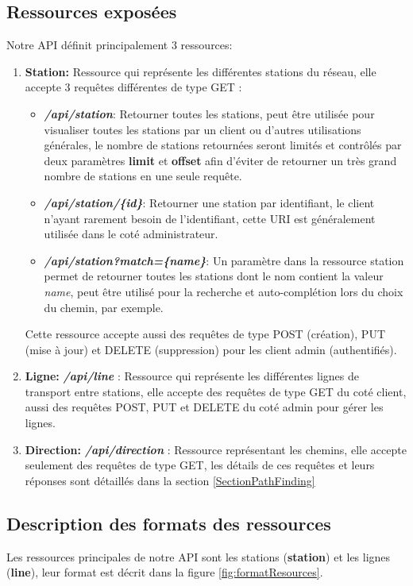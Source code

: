 \subsection{Ressources exposées}
Notre API définit principalement 3 ressources:
\begin{enumerate}
	\item \textbf{Station:} Ressource qui représente les différentes stations du réseau, elle accepte 3 requêtes différentes de type GET  : 
	      \begin{itemize}
	      	\item \emph{\textbf{/api/station}}: Retourner toutes les stations, peut être utilisée pour visualiser toutes les stations par un client ou d'autres utilisations générales, le nombre de stations retournées seront limités et contrôlés par deux paramètres \textbf{limit} et \textbf{offset} afin d'éviter de retourner un très grand nombre de stations en une seule requête.
	      	\item \emph{\textbf{/api/station/\{id\}}}: Retourner une station par identifiant, le client n'ayant rarement besoin de l'identifiant, cette URI est généralement utilisée dans le coté administrateur.
	      	\item \emph{\textbf{/api/station?match=\{name\}}}: Un paramètre dans la ressource station permet de retourner toutes les stations dont le nom contient la valeur \emph{name}, peut être utilisé pour la recherche et auto-complétion lors du choix du chemin, par exemple.
	      \end{itemize}
	      	      			
	      Cette ressource accepte aussi des requêtes de type POST (création), PUT (mise à jour) et DELETE (suppression)  pour les client admin (authentifiés).
	\item \textbf{Ligne:} \emph{\textbf{/api/line}} : Ressource qui représente les différentes lignes de transport entre stations, elle accepte des requêtes de type GET du coté client, aussi des requêtes POST, PUT et DELETE du coté admin pour gérer les lignes.
	\item \textbf{Direction:}  \emph{\textbf{/api/direction}} : Ressource représentant les chemins, elle accepte seulement des requêtes de type GET, les détails de ces requêtes et leurs réponses sont détaillés dans la section \ref{SectionPathFinding}
\end{enumerate}
\subsection{Description des formats des ressources}
Les ressources principales de notre API sont les stations (\textbf{station}) et les lignes (\textbf{line}), leur format est décrit dans la figure \ref{fig:formatResources}.
\label{ref:resources}
\lstset{style=JSON}

